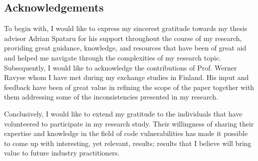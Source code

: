 

\vspace*{\fill}

\vspace{-2cm}
\begin{center}
    \section*{Acknowledgements}
\end{center}

\bigskip
\bigskip
\bigskip







\noindent To begin with, I would like to express my sincerest gratitude towards my thesis advisor Adrian Spataru for his support throughout the course of my research, providing great guidance, knowledge, and resources that have been of great aid and helped me navigate through the complexities of my research topic. Subsequently, I would like to acknowledge the contributions of Prof. Werner Ravyse whom I have met during my exchange studies in Finland. His input and feedback have been of great value in refining the scope of the paper together with them addressing some of the inconsistencies presented in my research.\\

\medskip

\noindent Conclusively, I would like to extend my gratitude to the individuals that have volunteered to participate in my research study. Their willingness of sharing their expertise and knowledge in the field of code vulnerabilities has made it possible to come up with interesting, yet relevant, results; results that I believe will bring value to future industry practitioners.



\vspace*{\fill}